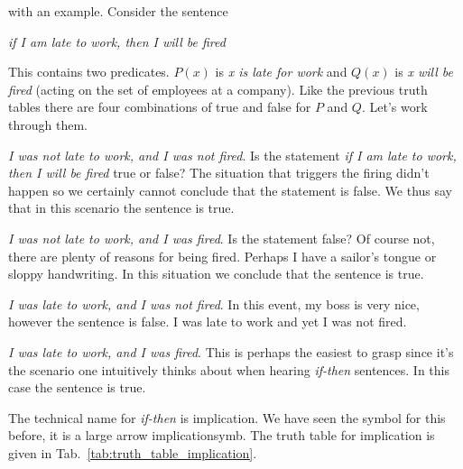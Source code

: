             with an example. Consider the sentence
            \begin{center}
                \textit{if I am late to work, then I will be fired}
            \end{center}
            This contains two predicates. $P(x)$ is \textit{x is late for work}
            and $Q(x)$ is \textit{x will be fired} (acting on the set of
            employees at a company). Like the previous truth tables there are
            four combinations of true and false for $P$ and $Q$. Let's work
            through them.
            \par\hfill\par
            \textit{I was not late to work, and I was not fired}. Is the
            statement \textit{if I am late to work, then I will be fired}
            true or false? The situation that triggers the firing didn't happen
            so we certainly cannot conclude that the statement is false. We
            thus say that in this scenario the sentence is true.
            \par\hfill\par
            \textit{I was not late to work, and I was fired}. Is the statement
            false? Of course not, there are plenty of reasons for being fired.
            Perhaps I have a sailor's tongue or sloppy handwriting. In this
            situation we conclude that the sentence is true.
            \par\hfill\par
            \textit{I was late to work, and I was not fired}. In this event, my
            boss is very nice, however the sentence is false. I was late to work
            and yet I was not fired.
            \par\hfill\par
            \textit{I was late to work, and I was fired}. This is perhaps the
            easiest to grasp since it's the scenario one intuitively thinks
            about when hearing \textit{if-then} sentences. In this case the
            sentence is true.
            \par\hfill\par
            The technical name for \textit{if-then} is \gls{implication}. We
            have seen the symbol for this before, it is a large arrow
            \gls{implicationsymb}. The truth table for implication is given in
            Tab.~\ref{tab:truth_table_implication}.
